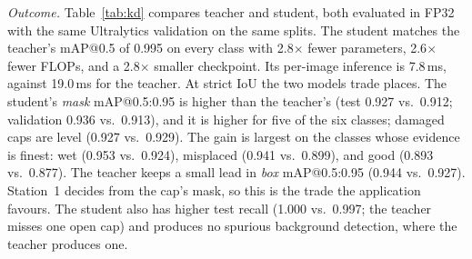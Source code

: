 \documentclass[conference]{IEEEtran}
\begin{document}
\textit{Outcome.} Table~\ref{tab:kd} compares teacher and student, both evaluated in FP32 with the same Ultralytics validation on the same splits. The student matches the teacher's mAP@0.5 of 0.995 on every class with 2.8$\times$ fewer parameters, 2.6$\times$ fewer FLOPs, and a 2.8$\times$ smaller checkpoint. Its per-image inference is 7.8\,ms, against 19.0\,ms for the teacher. At strict IoU the two models trade places. The student's \emph{mask} mAP@0.5:0.95 is higher than the teacher's (test 0.927 vs.\ 0.912; validation 0.936 vs.\ 0.913), and it is higher for five of the six classes; damaged caps are level (0.927 vs.\ 0.929). The gain is largest on the classes whose evidence is finest: wet (0.953 vs.\ 0.924), misplaced (0.941 vs.\ 0.899), and good (0.893 vs.\ 0.877). The teacher keeps a small lead in \emph{box} mAP@0.5:0.95 (0.944 vs.\ 0.927). Station~1 decides from the cap's mask, so this is the trade the application favours. The student also has higher test recall (1.000 vs.\ 0.997; the teacher misses one open cap) and produces no spurious background detection, where the teacher produces one.

\begin{table}[t]
\caption{Teacher vs.\ distilled student (FP32, 640\,px)}
\label{tab:kd}
\centering
\setlength{\tabcolsep}{3pt}
\end{table}
\end{document}
